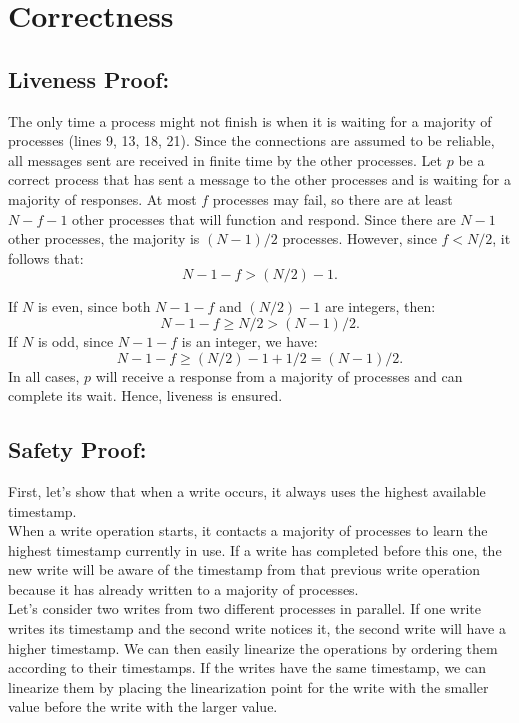 \documentclass{article}
\begin{document}
\section*{Correctness}

\subsection*{Liveness Proof:}
The only time a process might not finish is when it is waiting for a majority of processes (lines 9, 13, 18, 21). Since the connections are assumed to be reliable, all messages sent are received in finite time by the other processes. Let $p$ be a correct process that has sent a message to the other processes and is waiting for a majority of responses. At most $f$ processes may fail, so there are at least $N - f - 1$ other processes that will function and respond. Since there are $N - 1$ other processes, the majority is $(N - 1)/2$ processes. However, since $f < N/2$, it follows that:
\[
N - 1 - f > (N / 2) - 1.
\]

If $N$ is even, since both $N - 1 - f$ and $(N / 2) - 1$ are integers, then:
\[
N - 1 - f \geq N / 2 > (N - 1) / 2.
\]
If $N$ is odd, since $N - 1 - f$ is an integer, we have:
\[
N - 1 - f \geq (N / 2) - 1 + 1/2 = (N - 1) / 2.
\]
In all cases, $p$ will receive a response from a majority of processes and can complete its wait. Hence, liveness is ensured.

\subsection*{Safety Proof:}
First, let’s show that when a write occurs, it always uses the highest available timestamp. \\ When a write operation starts, it contacts a majority of processes to learn the highest timestamp currently in use. If a write has completed before this one, the new write will be aware of the timestamp from that previous write operation because it has already written to a majority of processes.
\\Let’s consider two writes from two different processes in parallel. If one write writes its timestamp and the second write notices it, the second write will have a higher timestamp. We can then easily linearize the operations by ordering them according to their timestamps. If the writes have the same timestamp, we can linearize them by placing the linearization point for the write with the smaller value before the write with the larger value.
\end{document}

